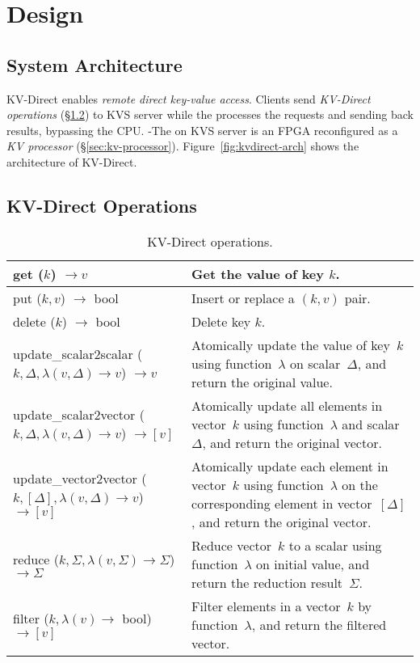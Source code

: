 \section{Design}
\label{sec:architecture}

\subsection{System Architecture}

KV-Direct enables \textit{remote direct key-value access}.
Clients send \textit{KV-Direct operations} (\S\ref{sec:kv-operations}) to KVS server while the \ournic{} processes the requests and sending back results, bypassing the CPU.
-The \ournic{} on KVS server is an FPGA reconfigured as a \textit{KV processor} (\S\ref{sec:kv-processor}).
Figure~\ref{fig:kvdirect-arch} shows the architecture of KV-Direct.

\subsection{KV-Direct Operations}
\label{sec:kv-operations}

\begin{table}
\centering
\caption{KV-Direct operations.}
\label{tab:kv-operations}
\small
\begin{tabular}{p{}|p{} }
\toprule
get ($k$) $\rightarrow v$ & Get the value of key $k$. \\
\midrule
put ($k, v$) $\rightarrow$ bool & Insert or replace a $(k, v)$ pair. \\
\midrule
delete ($k$) $\rightarrow$ bool & Delete key $k$. \\
\midrule
\midrule
update{\_}scalar2scalar ($k, \Delta, \lambda(v, \Delta) \rightarrow v$) $\rightarrow v$ & Atomically update the value of key~$k$ using function~$\lambda$ on scalar~$\Delta$, and return the original value. \\
\midrule
update{\_}scalar2vector ($k, \Delta, \lambda(v, \Delta) \rightarrow v$) $\rightarrow [v]$ & Atomically update all elements in vector~$k$ using function~$\lambda$ and scalar~$\Delta$, and return the original vector. \\
\midrule
update{\_}vector2vector ($k, [\Delta], \lambda(v, \Delta) \rightarrow v$) $\rightarrow [v]$ & Atomically update each element in vector~$k$ using function~$\lambda$ on the corresponding element in vector~$[\Delta]$, and return the original vector. \\
\midrule
reduce ($k, \Sigma, \lambda(v, \Sigma) \rightarrow \Sigma$) $\rightarrow \Sigma$ & Reduce vector~$k$ to a scalar using function~$\lambda$ on initial value, and return the reduction result~$\Sigma$. \\
\midrule
filter ($k, \lambda(v) \rightarrow$ bool) $\rightarrow [v]$ & Filter elements in a vector~$k$ by function~$\lambda$, and return the filtered vector. \\
\bottomrule
\end{tabular}
\vspace{-10pt}
\end{table}


